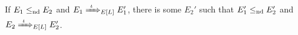 \begin{lem}
\label{lem:internal-control-lifting}
If $E_1 \leq_{\text{nd}} E_2$ and $E_1 \ctrlstep[\iota] E_1'$, there is some $E_2'$ such that $E_1' \leq_{\text{nd}} E_2'$ and $E_2 \ctrlstep[\iota] E_2'$.
\end{lem}
